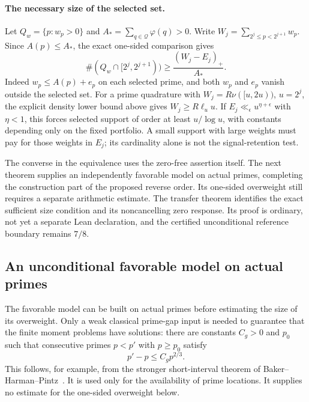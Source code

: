 \documentclass[11pt]{article}
\theoremstyle{definition}
\begin{document}
\paragraph{The necessary size of the selected set.}
Let $Q_w=\{p:w_p>0\}$ and $A_*=\sum_{q\in\mathcal Q}\varphi(q)>0$.
Write $W_j=\sum_{2^j\le p<2^{j+1}}w_p$. Since $A(p)\le A_*$,
the exact one-sided comparison gives
\begin{equation}
 \#(Q_w\cap[2^j,2^{j+1}))
       \ge\frac{(W_j-E_j)_+}{A_*}.
 \label{eq:overweight-support-size}
\end{equation}
Indeed $w_p\le A(p)+e_p$ on each selected prime, and both
$w_p$ and $e_p$ vanish outside the selected set.
For a prime quadrature with
$W_j=R\nu([u,2u))$, $u=2^j$, the explicit density lower bound
above gives $W_j\ge R\ell_u u$.
If $E_j\ll_\epsilon u^{\eta+\epsilon}$ with $\eta<1$,
this forces selected support of order at least $u/\log u$,
with constants depending only on the fixed portfolio.
A small support with large weights must pay for those weights
in $E_j$; its cardinality alone is not the signal-retention test.

The converse in the equivalence uses the zero-free assertion
itself. The next theorem supplies an independently favorable
model on actual primes, completing the construction part of
the proposed reverse order. Its one-sided overweight still
requires a separate arithmetic estimate. The transfer theorem
identifies the exact sufficient size condition and its
noncancelling zero response. Its proof is ordinary, not yet
a separate Lean declaration, and the certified unconditional
reference boundary remains $7/8$.


\subsection{An unconditional favorable model on actual primes}
\label{sec:actual-favorable-prime-model}

The favorable model can be built on actual primes before estimating
the size of its overweight. Only a weak classical prime-gap input
is needed to guarantee that the finite moment problems have solutions:
there are constants $C_g>0$ and $p_0$ such that consecutive primes
$p<p'$ with $p\ge p_0$ satisfy
\begin{equation}
                         p'-p\le C_g p^{2/3}.
 \label{eq:weak-prime-grid-input}
\end{equation}
This follows, for example, from the stronger short-interval
theorem of Baker--Harman--Pintz~\cite[Theorem~1]{BakerHarmanPintz}.
It is used only for the availability of prime locations.
It supplies no estimate for the one-sided overweight below.
\end{document}
